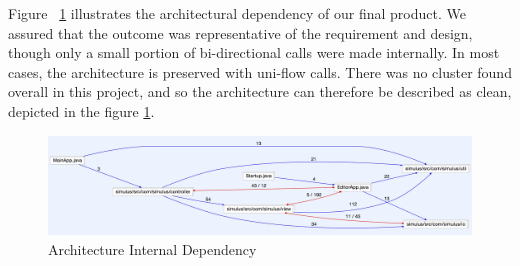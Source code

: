 Figure ~\ref{fig:archIntDependency} illustrates the architectural dependency of our final product. We assured that the outcome was representative of the requirement and design, though only a small portion of bi-directional calls were made internally. In most cases, the architecture is preserved with uni-flow calls. There was no cluster found overall in this project, and so the architecture can therefore be described as clean, depicted in the figure \ref{fig:archIntDependency}. 

\begin{figure}[h]
        \begin{center}
                        \includegraphics[width=\textwidth]{img/archIntDependency.png}
                \caption{Architecture Internal Dependency}
        \label{fig:archIntDependency}
        \end{center}
\end{figure}

\clearpage